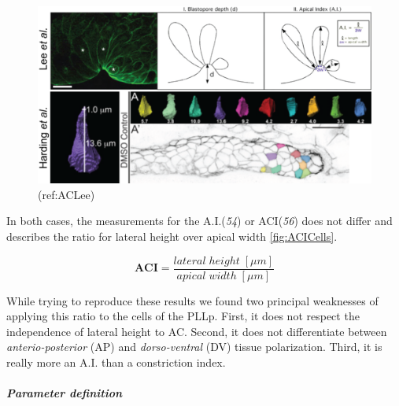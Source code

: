 \documentclass[11pt,singlespacinge,twoside]{reedthesis} %
\begin{document}
\begin{figure}

{\centering \includegraphics[width=0.75\linewidth]{figures/materials/models/ai} 

}

\caption[A.I. indeces in the literature]{(ref:ACLee)}\label{fig:ACLee}
\end{figure}
\noindent In both cases, the measurements for the A.I.(\emph{54}) or ACI(\emph{56}) does not differ and describes the ratio for lateral height over apical width \ref{fig:ACICells}.

\[\mathbf{ACI} = \frac{lateral\;height\;[\mu m]}{apical\;width\;[\mu m]}\]

\noindent While trying to reproduce these results we found two principal weaknesses of applying this ratio to the cells of the PLLp. First, it does not respect the independence of lateral height to AC. Second, it does not differentiate between \emph{anterio-posterior} (AP) and \emph{dorso-ventral} (DV) tissue polarization. Third, it is really more an A.I. than a constriction index.

\hypertarget{ACI-param}{%
\subparagraph{Parameter definition}\label{ACI-param}}
\end{document}
